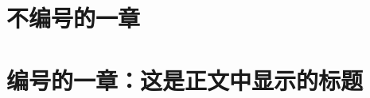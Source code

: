 ﻿\documentclass{article}
\begin{document}
\tableofcontents
\newpage


\section*{不编号的一章}
\blindtext

\section[编号的一章：这是目录中显示的标题]{编号的一章：这是正文中显示的标题}
    \vspace{5em}
\end{document}
